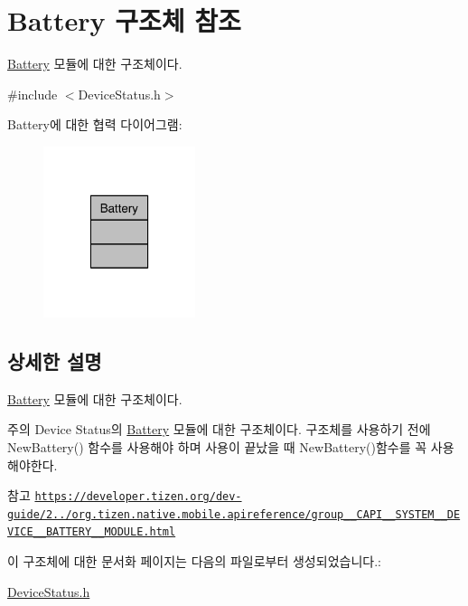 \hypertarget{struct_battery}{\section{Battery 구조체 참조}
\label{struct_battery}
}


\hyperlink{struct_battery}{Battery} 모듈에 대한 구조체이다.  




{\ttfamily \#include $<$Device\-Status.\-h$>$}



Battery에 대한 협력 다이어그램\-:\nopagebreak
\begin{figure}[H]
\begin{center}
\leavevmode
\includegraphics[width=126pt]{db/de4/struct_battery__coll__graph}
\end{center}
\end{figure}


\subsection{상세한 설명}
\hyperlink{struct_battery}{Battery} 모듈에 대한 구조체이다. 

\begin{DoxyNote}{주의}
Device Status의 \hyperlink{struct_battery}{Battery} 모듈에 대한 구조체이다. 구조체를 사용하기 전에 New\-Battery() 함수를 사용해야 하며 사용이 끝났을 때 New\-Battery()함수를 꼭 사용해야한다. 
\end{DoxyNote}
\begin{DoxySeeAlso}{참고}
\href{https://developer.tizen.org/dev-guide/2.3.0/org.tizen.native.mobile.apireference/group__CAPI__SYSTEM__DEVICE__BATTERY__MODULE.html}{\tt https\-://developer.\-tizen.\-org/dev-\/guide/2../org.\-tizen.\-native.\-mobile.\-apireference/group\-\_\-\-\_\-\-C\-A\-P\-I\-\_\-\-\_\-\-S\-Y\-S\-T\-E\-M\-\_\-\-\_\-\-D\-E\-V\-I\-C\-E\-\_\-\-\_\-\-B\-A\-T\-T\-E\-R\-Y\-\_\-\-\_\-\-M\-O\-D\-U\-L\-E.\-html} 
\end{DoxySeeAlso}


이 구조체에 대한 문서화 페이지는 다음의 파일로부터 생성되었습니다.\-:\begin{DoxyCompactItemize}
\item 
\hyperlink{_device_status_8h}{Device\-Status.\-h}\end{DoxyCompactItemize}
